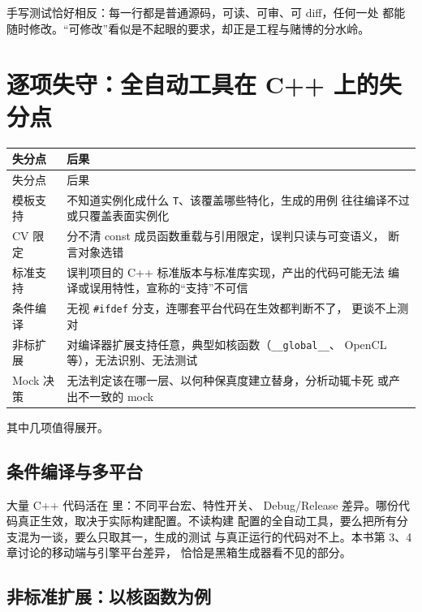 \documentclass[12pt,a4paper,fontset=fandol]{ctexbook}
\begin{document}
手写测试恰好相反：每一行都是普通源码，可读、可审、可 diff，任何一处
都能随时修改。“可修改”看似是不起眼的要求，却正是工程与赌博的分水岭。

\section{逐项失守：全自动工具在 C++ 上的失分点}

\begin{center}
\scriptsize
\setlength{\tabcolsep}{4pt}
\begin{longtable}{p{3.2cm}p{9.4cm}}
\toprule
失分点 & 后果 \\
\midrule
\endfirsthead
\toprule
失分点 & 后果 \\
\midrule
\endhead
模板支持 & 不知道实例化成什么 \texttt{T}、该覆盖哪些特化，生成的用例
往往编译不过或只覆盖表面实例化 \\
CV 限定 & 分不清 const 成员函数重载与引用限定，误判只读与可变语义，
断言对象选错 \\
标准支持 & 误判项目的 C++ 标准版本与标准库实现，产出的代码可能无法
编译或误用特性，宣称的“支持”不可信 \\
条件编译 & 无视 \texttt{\#ifdef} 分支，连哪套平台代码在生效都判断不了，
更谈不上测对 \\
非标扩展 & 对编译器扩展支持任意，典型如核函数（\texttt{\_\_global\_\_}、
OpenCL 等），无法识别、无法测试 \\
Mock 决策 & 无法判定该在哪一层、以何种保真度建立替身，分析动辄卡死
或产出不一致的 mock \\
\bottomrule
\end{longtable}
\end{center}

其中几项值得展开。

\subsection{条件编译与多平台}

大量 C++ 代码活在  里：不同平台宏、特性开关、
Debug/Release 差异。哪份代码真正生效，取决于实际构建配置。不读构建
配置的全自动工具，要么把所有分支混为一谈，要么只取其一，生成的测试
与真正运行的代码对不上。本书第 3、4 章讨论的移动端与引擎平台差异，
恰恰是黑箱生成器看不见的部分。

\subsection{非标准扩展：以核函数为例}
\end{document}

